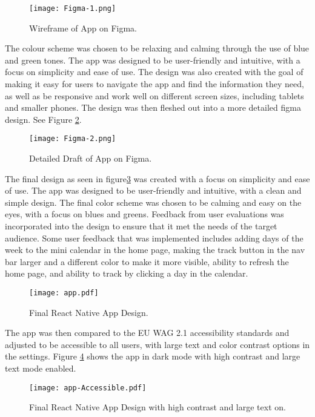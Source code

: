 \begin{figure}[h!!]
  \begin{center}
    \texttt{[image: Figma-1.png]}
    \caption{Wireframe of App on Figma.}
    \label{figure:figma-1}
  \end{center}
\end{figure}

The colour scheme was chosen to be relaxing and calming  through the use of blue and green tones. The app was designed to be user-friendly and intuitive, with a focus on simplicity and ease of use. The design was also created with the goal of making it easy for users to navigate the app and find the information they need, as well as be responsive and work well on different screen sizes, including tablets and smaller phones. The design was then fleshed out into a more detailed figma design. See Figure \ref{figure:figma-2}.
\begin{figure}[h!!]
  \begin{center}
    \texttt{[image: Figma-2.png]}
    \caption{Detailed Draft of App on Figma.}
    \label{figure:figma-2}
  \end{center}
\end{figure}

The final design as seen in figure\ref{figure:app} was created with a focus on simplicity and ease of use. The app was designed to be user-friendly and intuitive, with a clean and simple design. The final color scheme was chosen to be calming and easy on the eyes, with a focus on blues and greens. Feedback from user evaluations was incorporated into the design to ensure that it met the needs of the target audience. Some user feedback that was implemented includes adding days of the week to the mini calendar in the home page, making the track button in the nav bar larger and a different color to make it more visible, ability to refresh the home page, and ability to track by clicking a day in the calendar. 
\begin{figure}[h!!]
  \begin{center}
    \texttt{[image: app.pdf]}
    \caption{Final React Native App Design.}
    \label{figure:app}
  \end{center}
\end{figure}

The app was then compared to the EU WAG 2.1 accessibility standards and adjusted to be accessible to all users, with large text and color contrast options in the settings. Figure \ref{figure:app-Accessible} shows the app in dark mode with high contrast and large text mode enabled.
\begin{figure}[h!!]
  \begin{center}
    \texttt{[image: app-Accessible.pdf]}
    \caption{Final React Native App Design with high contrast and large text on.}
    \label{figure:app-Accessible}
  \end{center}
\end{figure}

